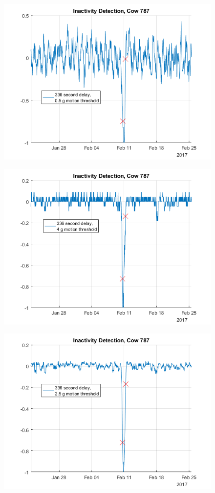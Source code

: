 \begin{figure}[h]
\centering
\includegraphics[width = 0.75 \textwidth]{figures/InactivityDetectionCow787_336period05threshold.png}
\caption{}
\label{}
\end{figure}

\begin{figure}[h]
\centering
\includegraphics[width = 0.75 \textwidth]{figures/InactivityDetectionCow787_336period4threshold.png}
\caption{}
\label{}
\end{figure}

\begin{figure}[h]
\centering
\includegraphics[width = 0.75 \textwidth]{figures/InactivityDetectionCow787_336period2_5threshold.png}
\caption{}
\label{}
\end{figure}

